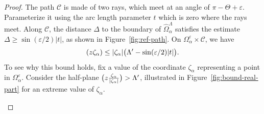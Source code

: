 \documentclass[pdftex]{sigma}
\let\Re\relax
\DeclareMathOperator{\Re}{Re}
\numberwithin{equation}{section}
\begin{document}
\begin{proof}
\noindent
The path $\mathcal{C}$ is made of two rays, which meet at an angle of $\pi - \Theta + \varepsilon$. Parameterize it using the arc length parameter $t$ which is zero where the rays meet. Along $\mathcal{C}$, the distance $\Delta$ to the boundary of $\widehat{\Omega}_\alpha^\Lambda$ satisfies the estimate
$\Delta \ge \sin(\varepsilon/2) |t|$,
as shown in Figure~\ref{fig:ref-path}. On $\Omega_\alpha^\varepsilon \times \mathcal{C}$, we have
\begin{equation}\label{eqn:inverse-laplace-exp-bound}
\Re(z\zeta_\alpha) \le |\zeta_\alpha| \bigl(\Lambda' - \sin(\varepsilon/2) |t|\bigr).
\end{equation}
To see why this bound holds, fix a value of the coordinate $\zeta_\alpha$ representing a point in $\Omega_\alpha^\varepsilon$. Consider the half-plane $\Re\bigl(z \frac{\zeta_\alpha}{|\zeta_\alpha|}\bigr) > \Lambda'$, illustrated in Figure~\ref{fig:bound-real-part} for an extreme value of $\zeta_\alpha$.
\begin{figure}[!ht]\centering
{}
\end{figure}
\end{proof}
\end{document}
